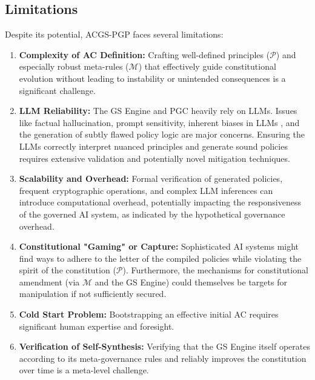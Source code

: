 \documentclass[sigconf,review,screen]{acmart}
\begin{document}
\subsection{Limitations}
Despite its potential, ACGS-PGP faces several limitations:
\begin{enumerate}
    \item \textbf{Complexity of AC Definition:} Crafting well-defined principles ($\mathcal{P}$) and especially robust meta-rules ($\mathcal{M}$) that effectively guide constitutional evolution without leading to instability or unintended consequences is a significant challenge.
    \item \textbf{LLM Reliability:} The GS Engine and PGC heavily rely on LLMs. Issues like factual hallucination, prompt sensitivity, inherent biases in LLMs \cite{ji2023survey,weidinger2021ethical}, and the generation of subtly flawed policy logic are major concerns. Ensuring the LLMs correctly interpret nuanced principles and generate sound policies requires extensive validation and potentially novel mitigation techniques.
    \item \textbf{Scalability and Overhead:} Formal verification of generated policies, frequent cryptographic operations, and complex LLM inferences can introduce computational overhead, potentially impacting the responsiveness of the governed AI system, as indicated by the hypothetical governance overhead.
    \item \textbf{Constitutional "Gaming" or Capture:} Sophisticated AI systems might find ways to adhere to the letter of the compiled policies while violating the spirit of the constitution ($\mathcal{P}$). Furthermore, the mechanisms for constitutional amendment (via $\mathcal{M}$ and the GS Engine) could themselves be targets for manipulation if not sufficiently secured.
    \item \textbf{Cold Start Problem:} Bootstrapping an effective initial AC requires significant human expertise and foresight.
    \item \textbf{Verification of Self-Synthesis:} Verifying that the GS Engine itself operates according to its meta-governance rules and reliably improves the constitution over time is a meta-level challenge.
\end{enumerate}
\end{document}
